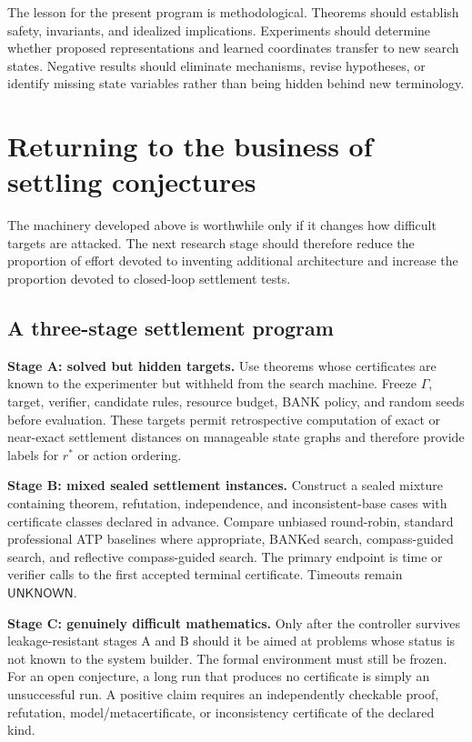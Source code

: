 \documentclass[11pt]{article}
\theoremstyle{definition}
\theoremstyle{remark}
\newcommand{\UNKNOWN}{\mathsf{UNKNOWN}}
\begin{document}
The lesson for the present program is methodological. Theorems should establish safety, invariants, and idealized implications. Experiments should determine whether proposed representations and learned coordinates transfer to new search states. Negative results should eliminate mechanisms, revise hypotheses, or identify missing state variables rather than being hidden behind new terminology.

\section{Returning to the business of settling conjectures}

The machinery developed above is worthwhile only if it changes how difficult targets are attacked. The next research stage should therefore reduce the proportion of effort devoted to inventing additional architecture and increase the proportion devoted to closed-loop settlement tests.

\subsection{A three-stage settlement program}

\textbf{Stage A: solved but hidden targets.} Use theorems whose certificates are known to the experimenter but withheld from the search machine. Freeze $\Gamma$, target, verifier, candidate rules, resource budget, BANK policy, and random seeds before evaluation. These targets permit retrospective computation of exact or near-exact settlement distances on manageable state graphs and therefore provide labels for $r^*$ or action ordering.

\textbf{Stage B: mixed sealed settlement instances.} Construct a sealed mixture containing theorem, refutation, independence, and inconsistent-base cases with certificate classes declared in advance. Compare unbiased round-robin, standard professional ATP baselines where appropriate, BANKed search, compass-guided search, and reflective compass-guided search. The primary endpoint is time or verifier calls to the first accepted terminal certificate. Timeouts remain $\UNKNOWN$.

\textbf{Stage C: genuinely difficult mathematics.} Only after the controller survives leakage-resistant stages A and B should it be aimed at problems whose status is not known to the system builder. The formal environment must still be frozen. For an open conjecture, a long run that produces no certificate is simply an unsuccessful run. A positive claim requires an independently checkable proof, refutation, model/metacertificate, or inconsistency certificate of the declared kind.
\end{document}

